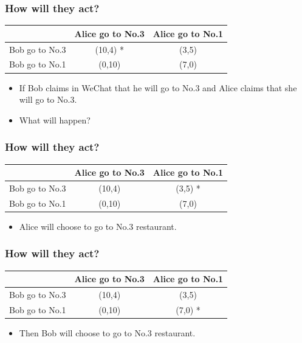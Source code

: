\documentclass{beamer}
\begin{document}
\begin{frame}
\frametitle{How will they act?}
\begin{tabular}{|c|c|c|}
\hline
\hline
    & {\color{red}Alice} go to No.3 & {\color{red}Alice} go to No.1\\
\hline
{\color{blue}Bob} go to No.3 & ({\color{blue}10},{\color{red}4}) {\color{green}*}& ({\color{blue}3},{\color{red}5})\\
\hline
{\color{blue}Bob} go to No.1 & ({\color{blue}0},{\color{red}10}) & ({\color{blue}7},{\color{red}0})\\
\hline
\hline
\end{tabular}
\begin{itemize}
\item
If {\color{blue}Bob} claims in WeChat that he will go to No.3 and {\color{red}Alice} claims that she will go to No.3.

\item What will happen?
\end{itemize}
\end{frame}

\begin{frame}
\frametitle{How will they act?}
\begin{tabular}{|c|c|c|}
\hline
\hline
    & {\color{red}Alice} go to No.3 & {\color{red}Alice} go to No.1\\
\hline
{\color{blue}Bob} go to No.3 & ({\color{blue}10},{\color{red}4})& ({\color{blue}3},{\color{red}5})  {\color{green}*}\\
\hline
{\color{blue}Bob} go to No.1 & ({\color{blue}0},{\color{red}10}) & ({\color{blue}7},{\color{red}0})\\
\hline
\hline
\end{tabular}
\begin{itemize}
\item {\color{red}Alice} will choose to go to No.3 restaurant.
\end{itemize}
\end{frame}

\begin{frame}
\frametitle{How will they act?}
\begin{tabular}{|c|c|c|}
\hline
\hline
    & {\color{red}Alice} go to No.3 & {\color{red}Alice} go to No.1\\
\hline
{\color{blue}Bob} go to No.3 & ({\color{blue}10},{\color{red}4})& ({\color{blue}3},{\color{red}5})\\
\hline
{\color{blue}Bob} go to No.1 & ({\color{blue}0},{\color{red}10}) & ({\color{blue}7},{\color{red}0}) {\color{green}*}\\
\hline
\hline
\end{tabular}
\begin{itemize}
\item Then {\color{blue}Bob} will choose to go to No.3 restaurant.
\end{itemize}
\end{frame}
\end{document}
